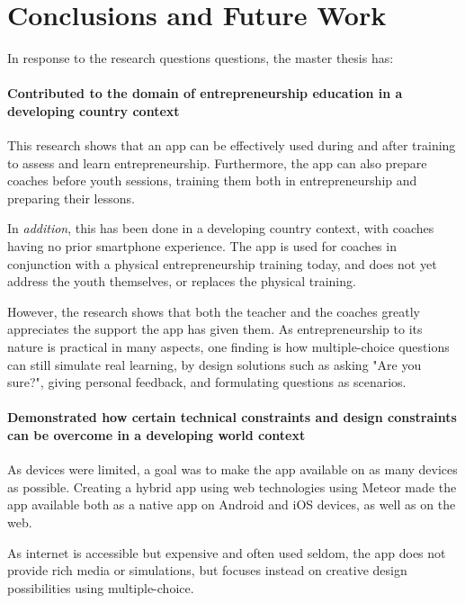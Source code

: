 \chapter{Conclusions and Future Work}\label{cha:conclusion}


In response to the research questions questions, the master thesis has: %

\subsubsection{Contributed to the domain of entrepreneurship education in a developing country context}
This research shows that an app can be effectively used during and after training to assess and learn entrepreneurship. Furthermore, the app can also prepare coaches before youth sessions, training them both in entrepreneurship and preparing their lessons.

In \textit{addition}, this has been done in a developing country context, with coaches having no prior smartphone experience. The app is used for coaches in conjunction with a physical entrepreneurship training today, and does not yet address the youth themselves, or replaces the physical training.

However, the research shows that both the teacher and the coaches greatly appreciates the support the app has given them. As entrepreneurship to its nature is practical in many aspects, one finding is how multiple-choice questions can still simulate real learning, by design solutions such as asking "Are you sure?", giving personal feedback, and formulating questions as scenarios.

\subsubsection{Demonstrated how certain technical constraints and design constraints can be overcome in a developing world context} %
As devices were limited, a goal was to make the app available on as many devices as possible. Creating a hybrid app using web technologies using Meteor made the app available both as a native app on Android and iOS devices, as well as on the web.

As internet is accessible but expensive and often used seldom, the app does not provide rich media or simulations, but focuses instead on creative design possibilities using multiple-choice.


